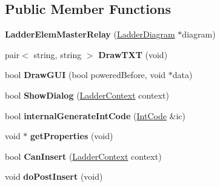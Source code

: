 \subsection*{Public Member Functions}
\begin{DoxyCompactItemize}
\item 
\hypertarget{class_ladder_elem_master_relay_a450e0168c3118753cb814de8f9d7df97}{{\bfseries Ladder\-Elem\-Master\-Relay} (\hyperlink{class_ladder_diagram}{Ladder\-Diagram} $\ast$diagram)}\label{class_ladder_elem_master_relay_a450e0168c3118753cb814de8f9d7df97}

\item 
\hypertarget{class_ladder_elem_master_relay_a24cd86cad80fe4e7fe0f9d11fab8e89e}{pair$<$ string, string $>$ {\bfseries Draw\-T\-X\-T} (void)}\label{class_ladder_elem_master_relay_a24cd86cad80fe4e7fe0f9d11fab8e89e}

\item 
\hypertarget{class_ladder_elem_master_relay_a989e496a2eb10cb14e7371c135a2d674}{bool {\bfseries Draw\-G\-U\-I} (bool powered\-Before, void $\ast$data)}\label{class_ladder_elem_master_relay_a989e496a2eb10cb14e7371c135a2d674}

\item 
\hypertarget{class_ladder_elem_master_relay_aa6a4be764a872a3df31e06e49af1a037}{bool {\bfseries Show\-Dialog} (\hyperlink{struct_ladder_context}{Ladder\-Context} context)}\label{class_ladder_elem_master_relay_aa6a4be764a872a3df31e06e49af1a037}

\item 
\hypertarget{class_ladder_elem_master_relay_ab730eb84a0a414e3b79ceb5c3e5468b1}{bool {\bfseries internal\-Generate\-Int\-Code} (\hyperlink{class_int_code}{Int\-Code} \&ic)}\label{class_ladder_elem_master_relay_ab730eb84a0a414e3b79ceb5c3e5468b1}

\item 
\hypertarget{class_ladder_elem_master_relay_af3cb4608e99355397478bcd78f842d5b}{void $\ast$ {\bfseries get\-Properties} (void)}\label{class_ladder_elem_master_relay_af3cb4608e99355397478bcd78f842d5b}

\item 
\hypertarget{class_ladder_elem_master_relay_a2d0a54eb80f0c244f643825e84295475}{bool {\bfseries Can\-Insert} (\hyperlink{struct_ladder_context}{Ladder\-Context} context)}\label{class_ladder_elem_master_relay_a2d0a54eb80f0c244f643825e84295475}

\item 
\hypertarget{class_ladder_elem_master_relay_aa83f2cfecc873a60ebae5fa2eb1f162b}{void {\bfseries do\-Post\-Insert} (void)}\label{class_ladder_elem_master_relay_aa83f2cfecc873a60ebae5fa2eb1f162b}


\end{DoxyCompactItemize}
